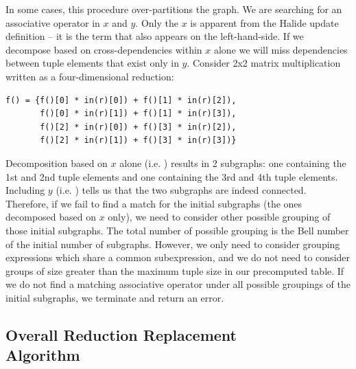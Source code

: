 In some cases, this procedure over-partitions the graph. We are searching for an associative operator in $x$ and $y$. Only the $x$ is apparent from the Halide update definition -- it is the term that also appears on the left-hand-side. If we decompose based on cross-dependencies within $x$ alone we will miss dependencies between tuple elements that exist only in $y$. Consider 2x2 matrix multiplication written as a four-dimensional reduction:

\begin{lstlisting}
f() = {f()[0] * in(r)[0]) + f()[1] * in(r)[2]),
       f()[0] * in(r)[1]) + f()[1] * in(r)[3]),
       f()[2] * in(r)[0]) + f()[3] * in(r)[2]),
       f()[2] * in(r)[1]) + f()[3] * in(r)[3])}
\end{lstlisting}

Decomposition based on $x$ alone (i.e. ) results in 2 subgraphs: one containing the 1st and 2nd tuple elements and one containing the 3rd and 4th tuple elements. Including $y$ (i.e. ) tells us that the two subgraphs are indeed connected. Therefore, if we fail to find a match for the initial subgraphs (the ones decomposed based on $x$ only), we need to consider other possible grouping of those initial subgraphs. The total number of possible grouping is the Bell number of the initial number of subgraphs. However, we only need to consider grouping expressions which share a common subexpression, and we do not need to consider groups of size greater than the maximum tuple size in our precomputed table. If we do not find a matching associative operator under all possible groupings of the initial subgraphs, we terminate and return an error.

\subsection{Overall Reduction Replacement\\ Algorithm}
\label{subsec:algorithm}

